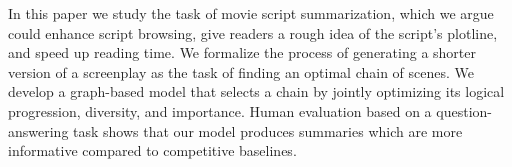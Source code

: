 In this paper we study the task of movie script summarization, which we argue could enhance script browsing, give readers a rough idea of the script's plotline, and speed up reading time. We formalize the process of generating a shorter version of a screenplay as the task of finding an optimal chain of scenes. We develop a graph-based model that selects a chain by jointly optimizing its logical progression, diversity, and importance. Human evaluation based on a question-answering task shows that our model produces summaries which are more informative compared to competitive baselines.
